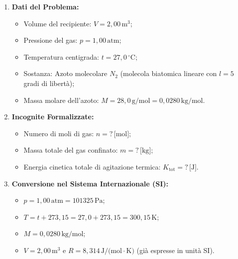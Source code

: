 \documentclass[11pt,a4paper,oneside]{report}
\begin{document}
\begin{problema}
\begin{enumerate}[label=\textbf{Fase \arabic*:}, leftmargin=*, itemsep=5pt]
  \item \textbf{Dati del Problema:}
  \begin{itemize}[leftmargin=*, label=\textbullet]
    \item Volume del recipiente: $V = 2{,}00\,\text{m}^3$;
    \item Pressione del gas: $p = 1{,}00\,\text{atm}$;
    \item Temperatura centigrada: $t = 27{,}0\,{^\circ}\text{C}$;
    \item Sostanza: Azoto molecolare $N_2$ (molecola biatomica lineare con $l = 5$ gradi di libert\`a);
    \item Massa molare dell'azoto: $M = 28{,}0\,\text{g/mol} = 0{,}0280\,\text{kg/mol}$.
  \end{itemize}

  \item \textbf{Incognite Formalizzate:}
  \begin{itemize}[leftmargin=*, label=\textbullet]
    \item Numero di moli di gas: $n = ?\,\text{[mol]}$;
    \item Massa totale del gas confinato: $m = ?\,\text{[kg]}$;
    \item Energia cinetica totale di agitazione termica: $K_{\text{tot}} = ?\,\text{[J]}$.
  \end{itemize}

  \item \textbf{Conversione nel Sistema Internazionale (SI):}
  \begin{itemize}[leftmargin=*, label=\textbullet]
    \item $p = 1{,}00\,\text{atm} = 101325\,\text{Pa}$;
    \item $T = t + 273{,}15 = 27{,}0 + 273{,}15 = 300{,}15\,\text{K}$;
    \item $M = 0{,}0280\,\text{kg/mol}$;
    \item $V = 2{,}00\,\text{m}^3$ e $R = 8{,}314\,\text{J/(mol}\cdot\text{K)}$ (gi\`a espresse in unit\`a SI).
  \end{itemize}


\end{enumerate}
\end{problema}
\end{document}
